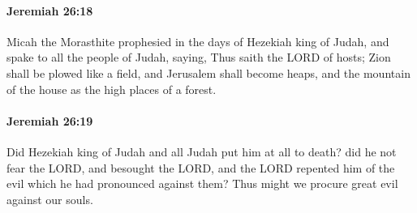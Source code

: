 		\paragraph{Jeremiah 26:18} %
			\label{JEREMIAH-26-18}

			Micah the Morasthite prophesied in the days of Hezekiah king of Judah, and spake to all the people of Judah, saying, Thus saith the LORD of hosts; Zion shall be plowed like a field, and Jerusalem shall become heaps, and the mountain of the house as the high places of a forest.


		\paragraph{Jeremiah 26:19} %
			\label{JEREMIAH-26-19}

			Did Hezekiah king of Judah and all Judah put him at all to death? did he not fear the LORD, and besought the LORD, and the LORD repented him of the evil which he had pronounced against them? Thus might we procure great evil against our souls.

